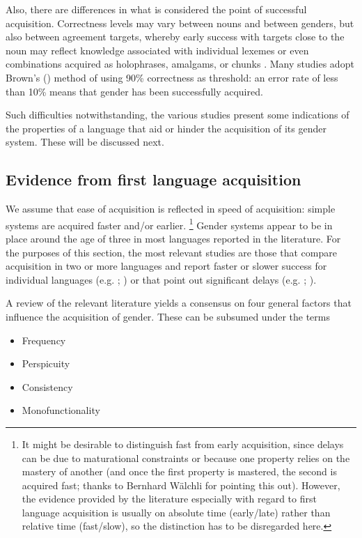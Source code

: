 \documentclass[output=collectionpaper]{langsci/langscibook}
\begin{document}
Also, there are differences in what is considered the point of successful acquisition. Correctness levels may vary between nouns and between genders, but also between agreement targets, whereby early success with targets close to the noun may reflect knowledge associated with individual lexemes or even combinations acquired as holophrases, amalgams, or chunks \citep[59--60]{MacWhinney1978}. Many studies adopt Brown's (\citeyear{Brown1973}) method of using 90\% correctness as threshold: an error rate of less than 10\% means that gender has been successfully acquired.

Such difficulties notwithstanding, the various studies present some indications of the properties of a language that aid or hinder the acquisition of its gender system. These will be discussed next.

\subsection{Evidence from first language acquisition}
\label{sec:Audr:4.2}

We assume that ease of acquisition is reflected in speed of acquisition: simple systems are acquired faster and/or earlier.%
\footnote{It might be desirable to distinguish fast from early acquisition, since delays can be due to maturational constraints or because one property relies on the mastery of another (and once the first property is mastered, the second is acquired fast; thanks to Bernhard Wälchli for pointing this out).  However, the evidence provided by the literature \textendash{} especially with regard to first language acquisition \textendash{} is usually on absolute time (early/late) rather than relative time (fast/slow), so the distinction has to be disregarded here.} %
Gender systems appear to be in place around the age of three in most languages reported in the literature. For the purposes of this section, the most relevant studies are those that compare acquisition in two or more languages and report faster or slower success for individual languages (e.g. \citealt{Mills1986}; \citealt{Eichler2013}) or that point out significant delays (e.g. \citealt{Mulford1985}; \citealt{Blom2008}).

A review of the relevant literature yields a consensus on four general factors that influence the acquisition of gender. These can be subsumed under the terms

\begin{itemize}
\item Frequency
\item Perspicuity
\item Consistency
\item Monofunctionality
\end{itemize}
\end{document}
